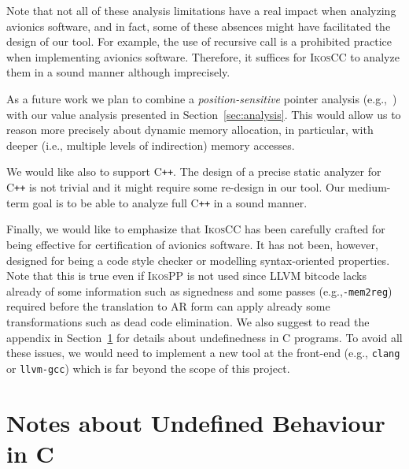 \documentclass[a4]{article}
\newcommand{\ignore}[1]{}
\newcommand{\ikoscc}{\textsc{IkosCC}\xspace}
\newcommand{\ikospp}{\textsc{IkosPP}\xspace}
\newcommand{\llvmgcc}{\texttt{llvm-gcc}\xspace}
\newcommand{\cpp}{C\texttt{++}\xspace}
\begin{document}
Note that not all of these analysis limitations have a real impact
when analyzing avionics software, and in fact, some of these absences
might have facilitated the design of our tool. For example, the use of
recursive call is a prohibited practice when implementing avionics
software. Therefore, it suffices for \ikoscc to analyze them in a
sound manner although imprecisely.

As a future work we plan to combine a \emph{position-sensitive}
pointer analysis (e.g.,~\cite{Venet04}) with our value analysis
presented in Section~\ref{sec:analysis}. This would allow us to reason
more precisely about dynamic memory allocation, in particular, with
deeper (i.e., multiple levels of indirection) memory accesses.

We would like also to support \cpp. The design of a precise static
analyzer for \cpp is not trivial and it might require some re-design
in our tool. Our medium-term goal is to be able to analyze full \cpp
in a sound manner.

Finally, we would like to emphasize that \ikoscc has been carefully
crafted for being effective for certification of avionics software. It
has not been, however, designed for being a code style checker or
modelling syntax-oriented properties. Note that this is true even if
\ikospp is not used since LLVM bitcode lacks already of some
information such as signedness and some passes
(e.g.,\texttt{-mem2reg}) required before the translation to AR form
can apply already some transformations such as dead code
elimination. We also suggest to read the appendix in
Section~\ref{sec:undefined} for details about undefinedness in C
programs. To avoid all these issues, we would need to implement a new
tool at the front-end (e.g., \texttt{clang} or \llvmgcc) which is far
beyond the scope of this project.

\ignore{
\section{Conclusions}
TODO
}




\newpage 

\appendix 

\section{Notes about Undefined Behaviour in C}
\label{sec:undefined}
\end{document}
